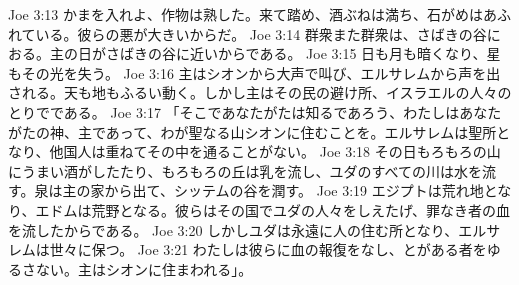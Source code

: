 Joe 3:13  かまを入れよ、作物は熟した。来て踏め、酒ぶねは満ち、石がめはあふれている。彼らの悪が大きいからだ。
Joe 3:14  群衆また群衆は、さばきの谷におる。主の日がさばきの谷に近いからである。
Joe 3:15  日も月も暗くなり、星もその光を失う。
Joe 3:16  主はシオンから大声で叫び、エルサレムから声を出される。天も地もふるい動く。しかし主はその民の避け所、イスラエルの人々のとりでである。
Joe 3:17  「そこであなたがたは知るであろう、わたしはあなたがたの神、主であって、わが聖なる山シオンに住むことを。エルサレムは聖所となり、他国人は重ねてその中を通ることがない。
Joe 3:18  その日もろもろの山にうまい酒がしたたり、もろもろの丘は乳を流し、ユダのすべての川は水を流す。泉は主の家から出て、シッテムの谷を潤す。
Joe 3:19  エジプトは荒れ地となり、エドムは荒野となる。彼らはその国でユダの人々をしえたげ、罪なき者の血を流したからである。
Joe 3:20  しかしユダは永遠に人の住む所となり、エルサレムは世々に保つ。
Joe 3:21  わたしは彼らに血の報復をなし、とがある者をゆるさない。主はシオンに住まわれる」。


